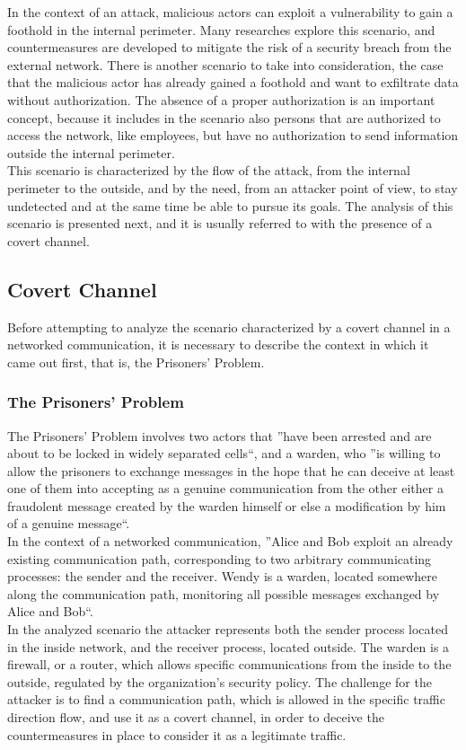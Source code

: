 \documentclass[12pt]{article}
\begin{document}
\pagebreak
In the context of an attack, malicious actors can exploit a vulnerability to gain a foothold in the internal perimeter. Many researches explore this scenario, and countermeasures are developed to mitigate the risk of a 
security breach from the external network. There is another scenario to take into consideration, the case that the malicious actor has already gained a foothold and want to exfiltrate data without authorization. The 
absence of a proper authorization is an important concept, because it includes in the scenario also persons that are authorized to access the network, like employees, but have no authorization to send information 
outside the internal perimeter.\\
This scenario is characterized by the flow of the attack, from the internal perimeter to the outside, and by the need, from an attacker point of view, to stay undetected and at the same time be able to pursue its goals. 
The analysis of this scenario is presented next, and it is usually referred to with the presence of a covert channel.

\subsection{Covert Channel}
\label{sub:covert}

Before attempting to analyze the scenario characterized by a covert channel in a networked communication, it is necessary to describe the context in which it came out first, that is, the Prisoners' Problem.

\subsubsection{The Prisoners' Problem}
\label{subsub:prisoners}

The Prisoners' Problem\cite{prisoners} involves two actors that ''have been arrested and are about to be locked in widely separated cells``, and a warden, who ''is willing to allow the prisoners 
to exchange messages in the hope that he can deceive at least one of them into accepting as a genuine communication from the other either a fraudolent message created by the warden himself or else a modification by him 
of a genuine message``.\\
In the context of a networked communication, ''Alice and Bob exploit an already existing communication path, corresponding to two arbitrary communicating processes: the sender and the receiver. Wendy is a warden, located 
somewhere along the communication path, monitoring all possible messages exchanged by Alice and Bob``\cite{netaware}.\\
In the analyzed scenario the attacker represents both the sender process located in the inside network, and the receiver process, located outside. The warden is a firewall, or a router, which allows specific communications 
from the inside to the outside, regulated by the organization's security policy. The challenge for the attacker is to find a communication path, which is allowed in the specific traffic direction flow, and use it as a 
covert channel, in order to deceive the countermeasures in place to consider it as a legitimate traffic.
\end{document}

